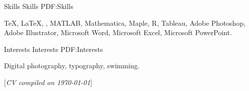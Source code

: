 \documentclass[letterpaper,MMMyyyy,nonstopmode]{simpleresumecv}
\newcommand{\CVNote}{CV compiled on {\today}}
\begin{document}
\begin{Body}





\Section
{Skills}
{Skills}
{PDF:Skills}

\Entry
{\TeX}, {\LaTeX}, {\XeLaTeX},
MATLAB,
Mathematica,
Maple,
R,
Tableau,
Adobe Photoshop,
Adobe Illustrator,
Microsoft Word,
Microsoft Excel,
Microsoft PowerPoint.



\Section
{Interests}
{Interests}
{PDF:Interests}

\Entry
Digital photography,
typography,
swimming.



%




\end{Body}


\UseNoteFont%
\null\hfill%
[\textit{\CVNote}]
\end{document}
